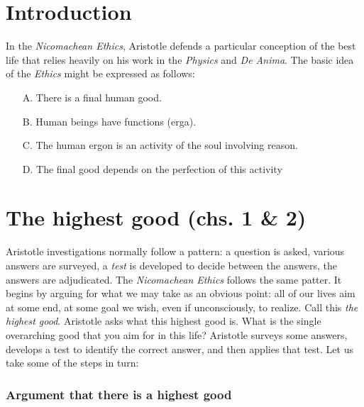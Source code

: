 \documentclass[oneside]{article}
\begin{document}
\thispagestyle{fancy}

\section*{Introduction}
In the \emph{Nicomachean Ethics}, Aristotle defends a particular conception of the best life that relies heavily on his work in the \emph{Physics} and \emph{De Anima}.  The basic idea of the \emph{Ethics} might be expressed as follows: 

\begin{enumerate}
\item[A.] There is a final human good. 
\item[B.] Human beings have functions (erga).
\item[C.] The human ergon is an activity of the soul involving reason.
\item[D.] The final good depends on the perfection of this activity
\end{enumerate}

\section*{The highest good (chs. 1 \& 2)}

Aristotle investigations normally follow a pattern: a question is asked, various answers are surveyed, a \emph{test} is developed to decide between the answers, the answers are adjudicated. The \emph{Nicomachean Ethics} follows the same patter. It begins by arguing for what we may take as an obvious point: all of our lives aim at some end, at some goal we wish, even if unconsciously, to realize. Call this \emph{the highest good}. Aristotle asks what this highest good is. What is the single overarching good that you aim for in this life? Aristotle surveys some answers, develops a test to identify the correct answer, and then applies that test. Let us take some of the steps in turn: 

\subsubsection*{Argument that there is a highest good}
\end{document}
